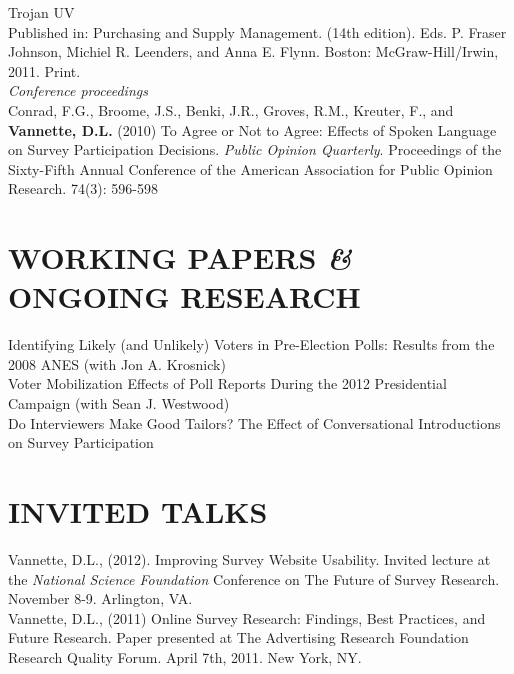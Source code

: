 \documentclass[a4paper,10pt]{article} %
\newcommand{\amper}{{\fontspec[Scale=.95]{Hoefler Text}\selectfont\itshape\&}}
\begin{document}
Trojan UV \\
Published in: Purchasing and Supply Management. (14th edition). Eds. P. Fraser Johnson, Michiel R. Leenders, and Anna E. Flynn. Boston: McGraw-Hill/Irwin, 2011. Print.\\


\textit{Conference proceedings} \medskip\\
Conrad, F.G., Broome, J.S., Benki, J.R., Groves, R.M., Kreuter, F., and \textbf{Vannette, D.L.} (2010) To Agree or Not to Agree: Effects of Spoken Language on Survey Participation Decisions. \textit{Public Opinion Quarterly}. Proceedings of the Sixty-Fifth Annual Conference of the American Association for Public Opinion Research. 74(3): 596-598


\section{\small WORKING PAPERS \amper{} ONGOING RESEARCH}

Identifying Likely (and Unlikely) Voters in Pre-Election Polls: Results from the 2008 ANES (with Jon A. Krosnick)\medskip \\
Voter Mobilization Effects of Poll Reports During the 2012 Presidential Campaign (with Sean J. Westwood) 
\medskip\\
Do Interviewers Make Good Tailors? The Effect of Conversational Introductions on Survey Participation


\section{\small INVITED TALKS}

Vannette, D.L., (2012). Improving Survey Website Usability. Invited lecture at the \emph{National Science Foundation} Conference on The Future of Survey Research. November 8-9. Arlington, VA. 
\medskip \\
Vannette, D.L., (2011) Online Survey Research: Findings, Best Practices, and Future Research. Paper presented at The Advertising Research Foundation Research Quality Forum. April 7th, 2011. New York, NY.\\
\end{document}
